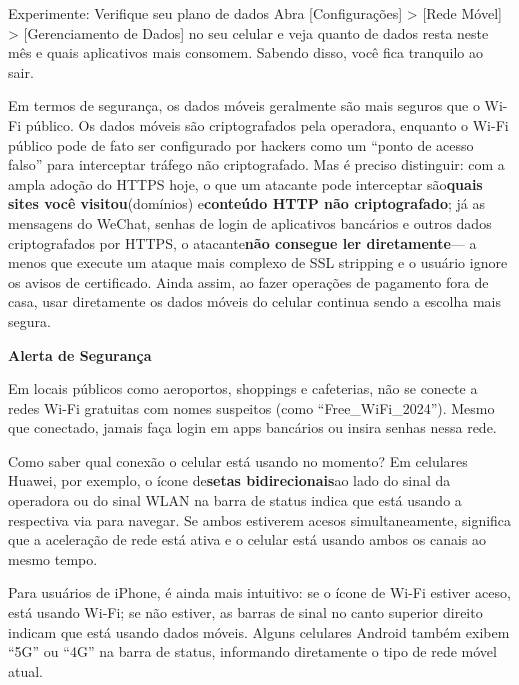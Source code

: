 \begin{tcbpractice}{Experimente: Verifique seu plano de dados}
Abra [Configurações] > [Rede Móvel] > [Gerenciamento de Dados] no seu celular e veja quanto de dados resta neste mês e quais aplicativos mais consomem. Sabendo disso, você fica tranquilo ao sair.

\end{tcbpractice}


Em termos de segurança, os dados móveis geralmente são mais seguros que o Wi-Fi público. Os dados móveis são criptografados pela operadora, enquanto o Wi-Fi público pode de fato ser configurado por hackers como um “ponto de acesso falso” para interceptar tráfego não criptografado. Mas é preciso distinguir: com a ampla adoção do HTTPS hoje, o que um atacante pode interceptar são\textbf{quais sites você visitou}(domínios) e\textbf{conteúdo HTTP não criptografado}; já as mensagens do WeChat, senhas de login de aplicativos bancários e outros dados criptografados por HTTPS, o atacante\textbf{não consegue ler diretamente}— a menos que execute um ataque mais complexo de SSL stripping e o usuário ignore os avisos de certificado. Ainda assim, ao fazer operações de pagamento fora de casa, usar diretamente os dados móveis do celular continua sendo a escolha mais segura.

\textbf{Alerta de Segurança}\par

Em locais públicos como aeroportos, shoppings e cafeterias, não se conecte a redes Wi-Fi gratuitas com nomes suspeitos (como “Free\_WiFi\_2024”). Mesmo que conectado, jamais faça login em apps bancários ou insira senhas nessa rede.


Como saber qual conexão o celular está usando no momento? Em celulares Huawei, por exemplo, o ícone de\textbf{setas bidirecionais}ao lado do sinal da operadora ou do sinal WLAN na barra de status indica que está usando a respectiva via para navegar. Se ambos estiverem acesos simultaneamente, significa que a aceleração de rede está ativa e o celular está usando ambos os canais ao mesmo tempo.

Para usuários de iPhone, é ainda mais intuitivo: se o ícone de Wi-Fi estiver aceso, está usando Wi-Fi; se não estiver, as barras de sinal no canto superior direito indicam que está usando dados móveis. Alguns celulares Android também exibem “5G” ou “4G” na barra de status, informando diretamente o tipo de rede móvel atual.

